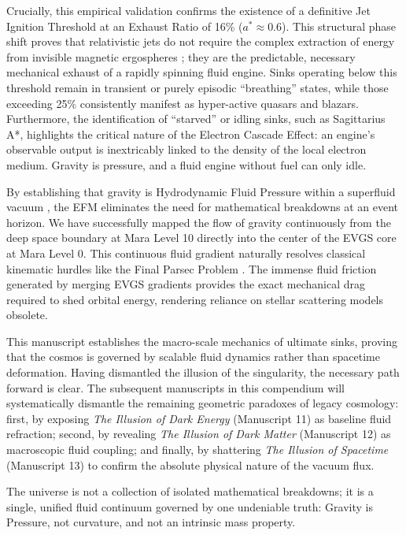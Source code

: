 \documentclass[11pt, a4paper]{article}
\begin{document}
Crucially, this empirical validation confirms the existence of a definitive Jet Ignition Threshold at an Exhaust Ratio of 16\% ($a^* \approx 0.6$). This structural phase shift proves that relativistic jets do not require the complex extraction of energy from invisible magnetic ergospheres \cite{blandford1977}; they are the predictable, necessary mechanical exhaust of a rapidly spinning fluid engine. Sinks operating below this threshold remain in transient or purely episodic ``breathing'' states, while those exceeding 25\% consistently manifest as hyper-active quasars and blazars. Furthermore, the identification of ``starved'' or idling sinks, such as Sagittarius A*, highlights the critical nature of the Electron Cascade Effect: an engine's observable output is inextricably linked to the density of the local electron medium. Gravity is pressure, and a fluid engine without fuel can only idle.

By establishing that gravity is Hydrodynamic Fluid Pressure within a superfluid vacuum \cite{sinha1975}, the EFM eliminates the need for mathematical breakdowns at an event horizon. We have successfully mapped the flow of gravity continuously from the deep space boundary at Mara Level 10 directly into the center of the EVGS core at Mara Level 0. This continuous fluid gradient naturally resolves classical kinematic hurdles like the Final Parsec Problem \cite{begelman1980}. The immense fluid friction generated by merging EVGS gradients provides the exact mechanical drag required to shed orbital energy, rendering reliance on stellar scattering models obsolete.

This manuscript establishes the macro-scale mechanics of ultimate sinks, proving that the cosmos is governed by scalable fluid dynamics rather than spacetime deformation. Having dismantled the illusion of the singularity, the necessary path forward is clear. The subsequent manuscripts in this compendium will systematically dismantle the remaining geometric paradoxes of legacy cosmology: 
first, by exposing \textit{The Illusion of Dark Energy} (Manuscript 11) as baseline fluid refraction; 
second, by revealing \textit{The Illusion of Dark Matter} (Manuscript 12) as macroscopic fluid coupling; 
and finally, by shattering \textit{The Illusion of Spacetime} (Manuscript 13) to confirm the absolute physical nature of the vacuum flux. 

The universe is not a collection of isolated mathematical breakdowns; it is a single, unified fluid continuum governed by one undeniable truth: Gravity is Pressure, not curvature, and not an intrinsic mass property.
\end{document}
